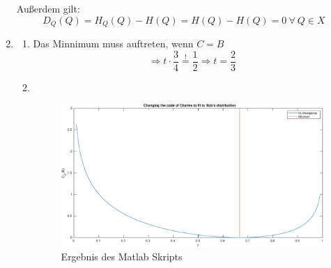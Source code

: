 \documentclass[DIN, pagenumber=false, fontsize=11pt, parskip=half]{scrartcl}
\begin{document}
\begin{enumerate}
			Außerdem gilt:
			\begin{equation*}
					D_Q(Q) = H_Q(Q) - H(Q) = H(Q) - H(Q) = 0 \ \forall \ Q \in X
			\end{equation*}
		\item
			\begin{enumerate}[label=(\alph*)]
				\item Das Minnimum muss auftreten, wenn $C=B$
						\begin{equation*}
								\Rightarrow t \cdot \frac{3}{4} \overset{!}{=} \frac{1}{2} \Rightarrow t = \frac{2}{3}
						\end{equation*}
				\item $ $ 
                    
                    

                    \begin{figure}[H]
                        \centering
                        \includegraphics[width=\textwidth]{plot.eps}
                        \caption{Ergebnis des Matlab Skripts}
                    \end{figure}
			\end{enumerate}
    \end{enumerate} 
\end{document}
